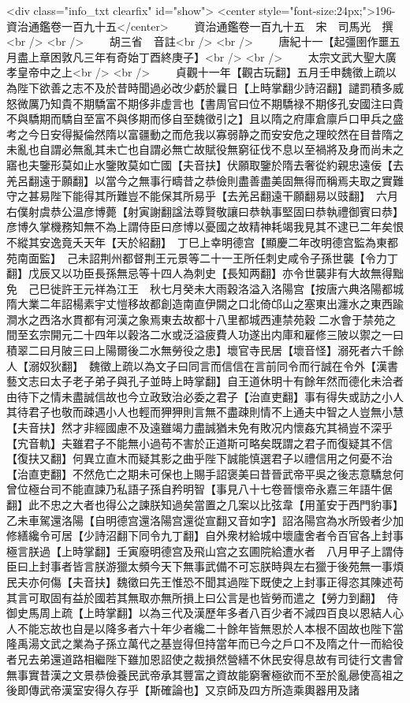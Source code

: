 <div class="info_txt clearfix" id="show">
<center style="font-size:24px;">196-資治通鑑卷一百九十五</center>
  　　資治通鑑卷一百九十五　宋　司馬光　撰<br />
<br />
　　胡三省　音註<br />
<br />
　　唐紀十一【起彊圉作噩五月盡上章困敦凡三年有奇始丁酉終庚子】<br />
<br />
　　太宗文武大聖大廣孝皇帝中之上<br />
<br />
　　貞觀十一年【觀古玩翻】五月壬申魏徵上疏以為陛下欲善之志不及於昔時聞過必改少虧於曩日【上時掌翻少詩沼翻】譴罰積多威怒微厲乃知貴不期驕富不期侈非虚言也【書周官曰位不期驕禄不期侈孔安國注曰貴不與驕期而驕自至富不與侈期而侈自至魏徵引之】且以隋之府庫倉廪戶口甲兵之盛考之今日安得擬倫然隋以富疆動之而危我以寡弱静之而安安危之理皎然在目昔隋之未亂也自謂必無亂其未亡也自謂必無亡故賦役無窮征伐不息以至禍將及身而尚未之寤也夫鑒形莫如止水鑒敗莫如亡國【夫音扶】伏願取鑒於隋去奢從約親忠遠佞【去羌呂翻遠于願翻】以當今之無事行疇昔之恭儉則盡善盡美固無得而稱焉夫取之實難守之甚易陛下能得其所難豈不能保其所易乎【去羌呂翻遠干願翻易以豉翻】　六月右僕射虞恭公温彦博薨【射寅謝翻諡法尊賢敬讓曰恭執事堅固曰恭執禮御賓曰恭】彦博久掌機務知無不為上謂侍臣曰彦博以憂國之故精神耗竭我見其不逮已二年矣恨不縱其安逸竟夭天年【天於紹翻】　丁巳上幸明德宫【顯慶二年改明德宫監為東都苑南面監】　己未詔荆州都督荆王元景等二十一王所任刺史咸令子孫世襲【令力丁翻】戊辰又以功臣長孫無忌等十四人為刺史【長知两翻】亦令世襲非有大故無得黜免　己巳徙許王元祥為江王　秋七月癸未大雨穀洛溢入洛陽宫【按唐六典洛陽都城隋大業二年詔楊素宇丈愷移故都創造南直伊闕之口北倚邙山之塞東出瀍水之東西踰澗水之西洛水貫都有河漢之象焉東去故都十八里都城西連禁苑穀二水會于禁苑之間至玄宗開元二十四年以穀洛二水或泛溢疲費人功遂出内庫和雇修三陂以禦之一曰積翠二曰月陂三曰上陽爾後二水無勞役之患】壞官寺民居【壞音怪】溺死者六千餘人【溺奴狄翻】　魏徵上疏以為文子曰同言而信信在言前同令而行誠在令外【漢書藝文志曰太子老子弟子與孔子並時上時掌翻】自王道休明十有餘年然而德化未洽者由待下之情未盡誠信故也今立政致治必委之君子【治直吏翻】事有得失或訪之小人其待君子也敬而疎遇小人也輕而狎狎則言無不盡疎則情不上通夫中智之人豈無小慧【夫音扶】然才非經國慮不及遠雖竭力盡誠猶未免有敗况内懷姦宄其禍豈不深乎【宄音軌】夫雖君子不能無小過苟不害於正道斯可略矣既謂之君子而復疑其不信【復扶又翻】何異立直木而疑其影之曲乎陛下誠能慎選君子以禮信用之何憂不治【治直吏翻】不然危亡之期未可保也上賜手詔褒美曰昔晉武帝平吳之後志意驕怠何曾位極台司不能直諫乃私語子孫自矜明智【事見八十七卷晉懷帝永嘉三年語牛倨翻】此不忠之大者也得公之諫朕知過矣當置之几案以比弦韋【用堇安于西門豹事】乙未車駕還洛陽【自明德宫還洛陽宫還從宣翻又音如字】詔洛陽宫為水所毁者少加修繕纔令可居【少詩沼翻下同令九丁翻】自外衆材給城中壞廬舍者令百官各上封事極言朕過【上時掌翻】壬寅廢明德宫及飛山宫之玄圃院給遭水者　八月甲子上謂侍臣曰上封事者皆言朕游獵太頻今天下無事武備不可忘朕時與左右獵于後苑無一事煩民夫亦何傷【夫音扶】魏徵曰先王惟恐不聞其過陛下既使之上封事正得恣其陳述苟其言可取固有益於國若其無取亦無所損上曰公言是也皆勞而遣之【勞力到翻】　侍御史馬周上疏【上時掌翻】以為三代及漢歷年多者八百少者不減四百良以恩結人心人不能忘故也自是以降多者六十年少者纔二十餘年皆無恩於人本根不固故也陛下當隆禹湯文武之業為子孫立萬代之基豈得但持當年而已今之戶口不及隋之什一而給役者兄去弟還道路相繼陛下雖加恩詔使之裁損然營繕不休民安得息故有司徒行文書曾無事實昔漢之文景恭儉養民武帝承其豐富之資故能窮奢極欲而不至於亂曏使高祖之後即傳武帝漢室安得久存乎【斯確論也】又京師及四方所造乘輿器用及諸